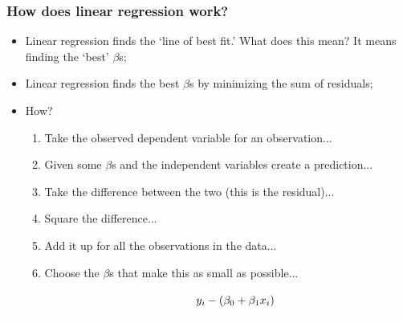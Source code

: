 \documentclass[aspectratio=169]{beamer}
\theoremstyle{principle}
\begin{document}
\begin{frame}
\frametitle{How does linear regression work?}

\begin{itemize}
\item Linear regression finds the `line of best fit.'  What does this mean?  It means finding the `best' $\beta$s;
\bigskip

\item Linear regression finds the best $\beta$s by minimizing the sum of residuals;
\bigskip

\item How?
\begin{enumerate}
\item Take the observed dependent variable for an observation...
\item Given some $\beta$s and the independent variables create a prediction...
\item Take the difference between the two (this is the residual)...
\item[]\color{white} Square the difference...
\item[]\color{white} Add it up for all the observations in the data...
\item[]\color{white} Choose the $\beta$s that make this as small as possible...
\end{enumerate}
\begin{align*}
\color{white}\min_{\beta_0,\beta_1}\sum_i(\color{black}y_i - (\beta_0 + \beta_1 x_i)\color{white})^2
\end{align*}
\end{itemize}

\end{frame}
\end{document}
